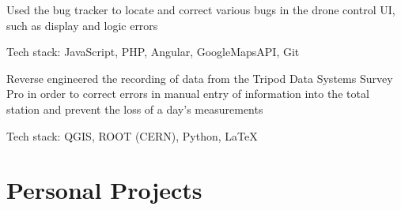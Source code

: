 \documentclass[letterpaper]{resume}
\begin{document}
\begin{compactitem}
\item Used the bug tracker to locate and correct various bugs in the drone control UI, such as display and logic errors
\item Tech stack: JavaScript, PHP, Angular, GoogleMapsAPI, Git
\end{compactitem}

\begin{compactitem}
\item Reverse engineered the recording of data from the Tripod Data Systems Survey Pro in order to correct errors in manual entry of information into the total station and prevent the loss of a day's measurements
\item Tech stack: QGIS, ROOT (CERN), Python, LaTeX
\end{compactitem}

\section{Personal Projects}

\end{document}
